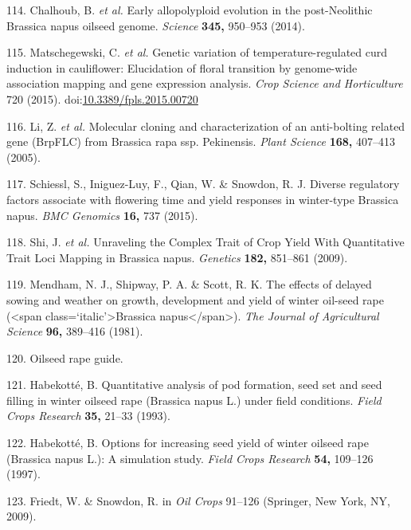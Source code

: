\documentclass[12pt,]{book}
\begin{document}
\hypertarget{ref-napus_genome_2014}{}
114. Chalhoub, B. \emph{et al.} Early allopolyploid evolution in the
post-Neolithic Brassica napus oilseed genome. \emph{Science}
\textbf{345,} 950--953 (2014).

\hypertarget{ref-matschegewski_genetic_2015}{}
115. Matschegewski, C. \emph{et al.} Genetic variation of
temperature-regulated curd induction in cauliflower: Elucidation of
floral transition by genome-wide association mapping and gene expression
analysis. \emph{Crop Science and Horticulture} 720 (2015).
doi:\href{https://doi.org/10.3389/fpls.2015.00720}{10.3389/fpls.2015.00720}

\hypertarget{ref-li_molecular_2005}{}
116. Li, Z. \emph{et al.} Molecular cloning and characterization of an
anti-bolting related gene (BrpFLC) from Brassica rapa ssp. Pekinensis.
\emph{Plant Science} \textbf{168,} 407--413 (2005).

\hypertarget{ref-schiessl_diverse_2015}{}
117. Schiessl, S., Iniguez-Luy, F., Qian, W. \& Snowdon, R. J. Diverse
regulatory factors associate with flowering time and yield responses in
winter-type Brassica napus. \emph{BMC Genomics} \textbf{16,} 737 (2015).

\hypertarget{ref-shi_unraveling_2009}{}
118. Shi, J. \emph{et al.} Unraveling the Complex Trait of Crop Yield
With Quantitative Trait Loci Mapping in Brassica napus. \emph{Genetics}
\textbf{182,} 851--861 (2009).

\hypertarget{ref-mendham_effects_1981}{}
119. Mendham, N. J., Shipway, P. A. \& Scott, R. K. The effects of
delayed sowing and weather on growth, development and yield of winter
oil-seed rape (\textless{}span class=`italic'\textgreater{}Brassica
napus\textless{}/span\textgreater{}). \emph{The Journal of Agricultural
Science} \textbf{96,} 389--416 (1981).

\hypertarget{ref-ahdb_oilseed_rape}{}
120. Oilseed rape guide.

\hypertarget{ref-habekotte_quantitative_1993}{}
121. Habekotté, B. Quantitative analysis of pod formation, seed set and
seed filling in winter oilseed rape (Brassica napus L.) under field
conditions. \emph{Field Crops Research} \textbf{35,} 21--33 (1993).

\hypertarget{ref-habekotte_options_1997}{}
122. Habekotté, B. Options for increasing seed yield of winter oilseed
rape (Brassica napus L.): A simulation study. \emph{Field Crops
Research} \textbf{54,} 109--126 (1997).

\hypertarget{ref-friedt_oilseed_2009}{}
123. Friedt, W. \& Snowdon, R. in \emph{Oil Crops} 91--126 (Springer,
New York, NY, 2009).
\end{document}
